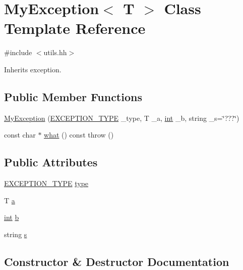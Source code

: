 \hypertarget{class_my_exception}{}\section{My\+Exception$<$ T $>$ Class Template Reference}
\label{class_my_exception}


{\ttfamily \#include $<$utils.\+hh$>$}



Inherits exception.

\subsection*{Public Member Functions}
\begin{DoxyCompactItemize}
\item 
\mbox{\hyperlink{class_my_exception_a64761d17cba58aea7336353837d7a80c}{My\+Exception}} (\mbox{\hyperlink{utils_8hh_af26a5d951fd6ab4b44e6cd8425aa0383}{E\+X\+C\+E\+P\+T\+I\+O\+N\+\_\+\+T\+Y\+PE}} \+\_\+type, T \+\_\+a, \mbox{\hyperlink{draw_8hh_aa620a13339ac3a1177c86edc549fda9b}{int}} \+\_\+b, string \+\_\+s=\char`\"{}???\char`\"{})
\item 
const char $\ast$ \mbox{\hyperlink{class_my_exception_ad0a4ef3c9897eb136fa37aec342406fd}{what}} () const  throw ()
\end{DoxyCompactItemize}
\subsection*{Public Attributes}
\begin{DoxyCompactItemize}
\item 
\mbox{\hyperlink{utils_8hh_af26a5d951fd6ab4b44e6cd8425aa0383}{E\+X\+C\+E\+P\+T\+I\+O\+N\+\_\+\+T\+Y\+PE}} \mbox{\hyperlink{class_my_exception_a6a422c140340e945df9548f548ea0ed8}{type}}
\item 
T \mbox{\hyperlink{class_my_exception_ae4b514f28c88dc08e7a27bc04f3b4655}{a}}
\item 
\mbox{\hyperlink{draw_8hh_aa620a13339ac3a1177c86edc549fda9b}{int}} \mbox{\hyperlink{class_my_exception_a42f4256beeac79f7ad8ad9682a9b83ee}{b}}
\item 
string \mbox{\hyperlink{class_my_exception_ac8762871298754f14ce579ee2c928510}{s}}
\end{DoxyCompactItemize}


\subsection{Constructor \& Destructor Documentation}
\mbox{\label{class_my_exception_a64761d17cba58aea7336353837d7a80c}} 
